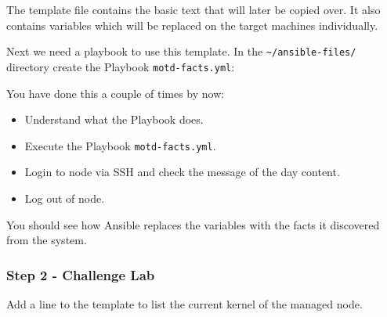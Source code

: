 The template file contains the basic text that will later be copied
over. It also contains variables which will be replaced on the target
machines individually.

Next we need a playbook to use this template. In the
\texttt{\textasciitilde{}/ansible-files/} directory create the Playbook
\texttt{motd-facts.yml}:

\begin{Shaded}
\begin{Highlighting}[]
\PreprocessorTok{{-}{-}{-}}
\KeywordTok{{-}}\AttributeTok{ }\KeywordTok{:}
\AttributeTok{  }\KeywordTok{:}
\AttributeTok{  }\KeywordTok{:}\AttributeTok{ }
\AttributeTok{  }\KeywordTok{:}
\AttributeTok{    }\KeywordTok{{-}}\AttributeTok{ }\KeywordTok{:}
\AttributeTok{        }\KeywordTok{:}
\AttributeTok{        }\KeywordTok{:}
\AttributeTok{        }\KeywordTok{:}
\AttributeTok{        }\KeywordTok{:}
\AttributeTok{        }\KeywordTok{:}\AttributeTok{ }
\end{Highlighting}
\end{Shaded}

You have done this a couple of times by now:

\begin{itemize}
\tightlist
\item
  Understand what the Playbook does.
\item
  Execute the Playbook \texttt{motd-facts.yml}.
\item
  Login to node via SSH and check the message of the day content.
\item
  Log out of node.
\end{itemize}

You should see how Ansible replaces the variables with the facts it
discovered from the system.

\hypertarget{step-2---challenge-lab}{%
\subsubsection{Step 2 - Challenge Lab}\label{step-2---challenge-lab}}

Add a line to the template to list the current kernel of the managed
node.

